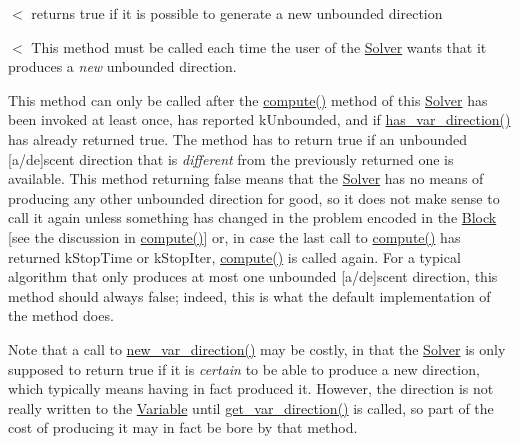 $<$ returns true if it is possible to generate a new unbounded direction 

$<$ This method must be called each time the user of the \mbox{\hyperlink{class_s_m_spp__di__unipi__it_1_1_solver}{Solver}} wants that it produces a {\itshape new} unbounded direction.

This method can only be called after the \mbox{\hyperlink{class_s_m_spp__di__unipi__it_1_1_solver_a504d4e3e174c7a518cc66156a8a45ce5}{compute()}} method of this \mbox{\hyperlink{class_s_m_spp__di__unipi__it_1_1_solver}{Solver}} has been invoked at least once, has reported k\+Unbounded, and if \mbox{\hyperlink{class_s_m_spp__di__unipi__it_1_1_solver_a27e8c876f577289e523ebf26aeeb977a}{has\+\_\+var\+\_\+direction()}} has already returned true. The method has to return true if an unbounded \mbox{[}a/de\mbox{]}scent direction that is {\itshape different} from the previously returned one is available. This method returning false means that the \mbox{\hyperlink{class_s_m_spp__di__unipi__it_1_1_solver}{Solver}} has no means of producing any other unbounded direction for good, so it does not make sense to call it again unless something has changed in the problem encoded in the \mbox{\hyperlink{class_s_m_spp__di__unipi__it_1_1_block}{Block}} \mbox{[}see the discussion in \mbox{\hyperlink{class_s_m_spp__di__unipi__it_1_1_solver_a504d4e3e174c7a518cc66156a8a45ce5}{compute()}}\mbox{]} or, in case the last call to \mbox{\hyperlink{class_s_m_spp__di__unipi__it_1_1_solver_a504d4e3e174c7a518cc66156a8a45ce5}{compute()}} has returned k\+Stop\+Time or k\+Stop\+Iter, \mbox{\hyperlink{class_s_m_spp__di__unipi__it_1_1_solver_a504d4e3e174c7a518cc66156a8a45ce5}{compute()}} is called again. For a typical algorithm that only produces at most one unbounded \mbox{[}a/de\mbox{]}scent direction, this method should always false; indeed, this is what the default implementation of the method does.

Note that a call to \mbox{\hyperlink{class_s_m_spp__di__unipi__it_1_1_solver_a673fc1c81a1fc86e55dfab3a37f303bc}{new\+\_\+var\+\_\+direction()}} may be costly, in that the \mbox{\hyperlink{class_s_m_spp__di__unipi__it_1_1_solver}{Solver}} is only supposed to return true if it is {\itshape certain} to be able to produce a new direction, which typically means having in fact produced it. However, the direction is not really written to the \mbox{\hyperlink{class_s_m_spp__di__unipi__it_1_1_variable}{Variable}} until \mbox{\hyperlink{class_s_m_spp__di__unipi__it_1_1_solver_a4bc119810c0c2ee3ba0c48183f50aaf4}{get\+\_\+var\+\_\+direction()}} is called, so part of the cost of producing it may in fact be bore by that method.

